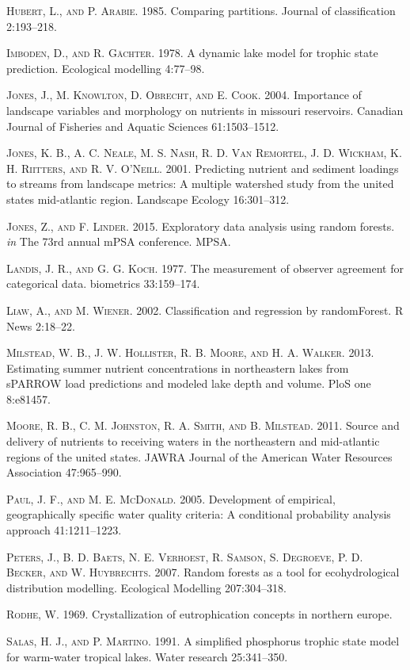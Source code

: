 \documentclass[11pt,]{article}
\begin{document}
\textsc{Hubert, L., and P. Arabie}. 1985. Comparing partitions. Journal
of classification 2:193--218.

\textsc{Imboden, D., and R. G{ä}chter}. 1978. A dynamic lake model for
trophic state prediction. Ecological modelling 4:77--98.

\textsc{Jones, J., M. Knowlton, D. Obrecht, and E. Cook}. 2004.
Importance of landscape variables and morphology on nutrients in
missouri reservoirs. Canadian Journal of Fisheries and Aquatic Sciences
61:1503--1512.

\textsc{Jones, K. B., A. C. Neale, M. S. Nash, R. D. Van Remortel, J. D.
Wickham, K. H. Riitters, and R. V. O'Neill}. 2001. Predicting nutrient
and sediment loadings to streams from landscape metrics: A multiple
watershed study from the united states mid-atlantic region. Landscape
Ecology 16:301--312.

\textsc{Jones, Z., and F. Linder}. 2015. Exploratory data analysis using
random forests. \emph{in} The 73rd annual mPSA conference. MPSA.

\textsc{Landis, J. R., and G. G. Koch}. 1977. The measurement of
observer agreement for categorical data. biometrics 33:159--174.

\textsc{Liaw, A., and M. Wiener}. 2002. Classification and regression by
randomForest. R News 2:18--22.

\textsc{Milstead, W. B., J. W. Hollister, R. B. Moore, and H. A.
Walker}. 2013. Estimating summer nutrient concentrations in northeastern
lakes from sPARROW load predictions and modeled lake depth and volume.
PloS one 8:e81457.

\textsc{Moore, R. B., C. M. Johnston, R. A. Smith, and B. Milstead}.
2011. Source and delivery of nutrients to receiving waters in the
northeastern and mid-atlantic regions of the united states. JAWRA
Journal of the American Water Resources Association 47:965--990.

\textsc{Paul, J. F., and M. E. McDonald}. 2005. Development of
empirical, geographically specific water quality criteria: A conditional
probability analysis approach 41:1211--1223.

\textsc{Peters, J., B. D. Baets, N. E. Verhoest, R. Samson, S. Degroeve,
P. D. Becker, and W. Huybrechts}. 2007. Random forests as a tool for
ecohydrological distribution modelling. Ecological Modelling
207:304--318.

\textsc{Rodhe, W.} 1969. Crystallization of eutrophication concepts in
northern europe.

\textsc{Salas, H. J., and P. Martino}. 1991. A simplified phosphorus
trophic state model for warm-water tropical lakes. Water research
25:341--350.
\end{document}
